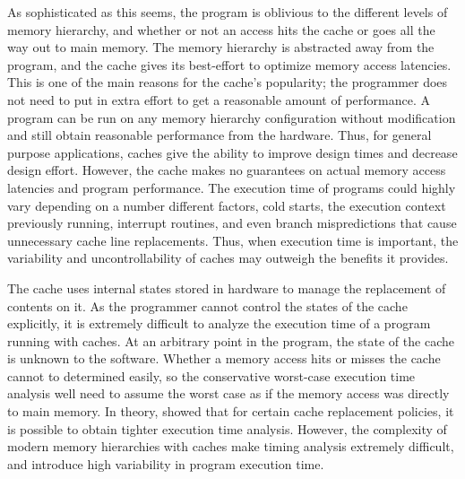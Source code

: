 As sophisticated as this seems, the program is oblivious to the different levels of memory hierarchy, and whether or not an access hits the cache or goes all the way out to main memory. 
The memory hierarchy is abstracted away from the program, and the cache gives its best-effort to optimize memory access latencies.
This is one of the main reasons for the cache's popularity; the programmer does not need to put in extra effort to get a reasonable amount of performance.
A program can be run on any memory hierarchy configuration without modification and still obtain reasonable performance from the hardware.   
Thus, for general purpose applications, caches give the ability to improve design times and decrease design effort.
However, the cache makes no guarantees on actual memory access latencies and program performance. 
The execution time of programs could highly vary depending on a number different factors, cold starts, the execution context previously running, interrupt routines, and even branch mispredictions that cause unnecessary cache line replacements.  
Thus, when execution time is important, the variability and uncontrollability of caches may outweigh the benefits it provides. 

The cache uses internal states stored in hardware to manage the replacement of contents on it. 
As the programmer cannot control the states of the cache explicitly, it is extremely difficult to analyze the execution time of a program running with caches.
At an arbitrary point in the program, the state of the cache is unknown to the software.
Whether a memory access hits or misses the cache cannot to determined easily, so the conservative worst-case execution time analysis well need to assume the worst case as if the memory access was directly to main memory.
In theory,  showed that for certain cache replacement policies, it is possible to obtain tighter execution time analysis. 
However, the complexity of modern memory hierarchies with caches make timing analysis extremely difficult, and introduce high variability in program execution time.

